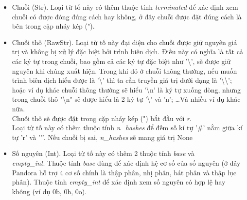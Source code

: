 \begin{itemize}
    \begin{itemize}
      \item Chuỗi (Str). Loại từ tố này có thêm thuộc tính \textit{terminated} để xác định xem chuỗi có được đóng đúng cách hay không, ở đây chuỗi được đặt đúng cách là bên trong cặp nháy kép (").
      \item Chuỗi thô (RawStr). Loại từ tố này đại diện cho chuỗi được giữ nguyên giá trị và không bị xử lý đặc biệt bởi trình biên dịch. Điều này có nghĩa là tất cả các ký tự trong chuỗi, bao gồm cả các ký tự đặc biệt như '\textbackslash', sẽ được giữ nguyên khi chúng xuất hiện. Trong khi đó ở chuỗi thông thường, nếu muốn trình biên dịch hiểu được là '\textbackslash' thì ta cần truyền giá trị dưới dạng là '\textbackslash\textbackslash'; hoặc ví dụ khác chuỗi thông thường sẽ hiểu '\textbackslash n' là ký tự xuống dòng, nhưng trong chuỗi thô "\textbackslash n" sẽ được hiểu là 2 ký tự '\textbackslash' và 'n'; \dots\space Và nhiều ví dụ khác nữa. 
      \\Chuỗi thô sẽ được đặt trong cặp nháy kép (") bắt đầu với \textit{r}.
      \\Loại từ tố này có thêm thuộc tính \textit{n\_hashes} để đếm số kí tự '\#' nằm giữa kí tự 'r' và '"'. Nếu chuỗi bị sai, \textit{n\_hashes} sẽ mang giá trị None
      \item Số nguyên (Int). Loại từ tố này có thêm 2 thuộc tính \textit{base} và \\\textit{empty\_int}. Thuộc tính \textit{base} dùng để xác định hệ cơ số của số nguyên (ở đây Pandora hỗ trợ 4 cơ số chính là thập phân, nhị phân, bát phân và thập lục phân). Thuộc tính \textit{empty\_int} để xác định xem số nguyên có hợp lệ hay không (ví dụ 0b, 0h, 0o).

\end{itemize}
\end{itemize}
